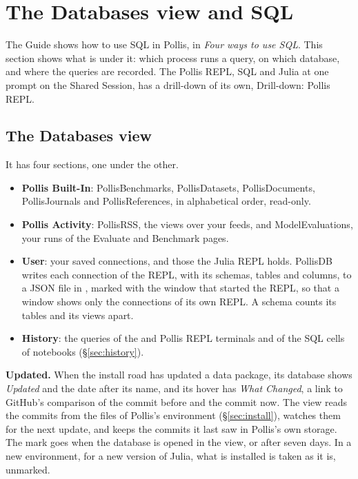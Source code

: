 \section{The Databases view and SQL}\label{sec:sql}

The Guide shows how to use SQL in Pollis, in \emph{Four ways to use SQL}. This section shows what is under it: which
process runs a query, on which database, and where the queries are recorded. The Pollis REPL, SQL and Julia at one
prompt on the Shared Session, has a drill-down of its own, Drill-down: Pollis REPL.

\subsection{The Databases view}
It has four sections, one under the other.
\begin{itemize}
  \item \textbf{Pollis Built-In}: PollisBenchmarks, PollisDatasets, PollisDocuments, PollisJournals and
    PollisReferences, in alphabetical order, read-only.
  \item \textbf{Pollis Activity}: PollisRSS, the views over your feeds, and ModelEvaluations, your runs of the Evaluate and
    Benchmark pages.
  \item \textbf{User}: your saved connections, and those the Julia REPL holds. PollisDB writes each connection of the
    REPL, with its schemas, tables and columns, to a JSON file in , marked with the
    window that started the REPL, so that a window shows only the connections of its own REPL. A schema counts its
    tables and its views apart.
  \item \textbf{History}: the queries of the  and Pollis REPL terminals and of the SQL cells of
    notebooks (\S\ref{sec:history}).
\end{itemize}
\textbf{Updated.} When the install road has updated a data package, its database shows \emph{Updated} and the date
after its name, and its hover has \emph{What Changed}, a link to GitHub's comparison of the commit before and the
commit now. The view reads the commits from the  files of Pollis's environment
(\S\ref{sec:install}), watches them for the next update, and keeps the commits it last saw in Pollis's own storage.
The mark goes when the database is opened in the view, or after seven days. In a new environment, for a new version
of Julia, what is installed is taken as it is, unmarked.

